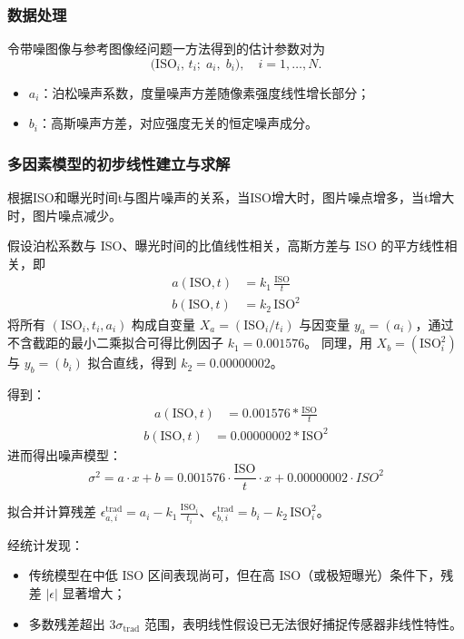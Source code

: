 \documentclass[a4paper]{article}
\begin{document}
    \subsubsection{数据处理}
    令带噪图像与参考图像经问题一方法得到的估计参数对为
	\[
		\bigl(\mathrm{ISO}_i,\,t_i;\;a_i,\;b_i\bigr),\quad
		i=1,\dots,N.
	\]
	\begin{itemize}
		\item $a_i$：泊松噪声系数，度量噪声方差随像素强度线性增长部分；
		\item $b_i$：高斯噪声方差，对应强度无关的恒定噪声成分。
	\end{itemize}

	
	\subsubsection{多因素模型的初步线性建立与求解}
	
	根据ISO和曝光时间t与图片噪声的关系，当ISO增大时，图片噪点增多，当t增大时，图片噪点减少。\par
	假设泊松系数与 ISO、曝光时间的比值线性相关，高斯方差与 ISO 的平方线性相关，即
	\begin{align}
		a(\mathrm{ISO},t) &= k_1 \,\frac{\mathrm{ISO}}{t}\label{eq:trad_a}\\
		b(\mathrm{ISO},t) &= k_2 \,\mathrm{ISO}^2\label{eq:trad_b}
	\end{align}
	\hspace{2em}将所有 $(\mathrm{ISO}_i,t_i,a_i)$ 构成自变量 $X_a=(\mathrm{ISO}_i/t_i)$ 与因变量 $y_a=(a_i)$，通过不含截距的最小二乘拟合可得比例因子 $k_1=0.001576$。  
	同理，用 $X_b=(\mathrm{ISO}_i^2)$ 与 $y_b=(b_i)$ 拟合直线，得到 $k_2=0.00000002$。\par
	得到：
	\begin{align}
		a(\mathrm{ISO},t) &= 0.001576*\frac{\mathrm{ISO}}{t}
	\end{align}
	\begin{align}
				b(\mathrm{ISO},t) &= 0.00000002*\mathrm{ISO}^2
	\end{align}
	进而得出噪声模型：
			$$
			\sigma^2 = a \cdot x + b = 0.001576 \cdot \frac{\mathrm{ISO}}{t} \cdot x + 0.00000002 \cdot ISO^2
		$$

	拟合并计算残差
	\(\epsilon^{\mathrm{trad}}_{a,i}=a_i - k_1\,\frac{\mathrm{ISO}_i}{t_i}\)、\(\epsilon^{\mathrm{trad}}_{b,i}=b_i - k_2\,\mathrm{ISO}_i^2\)。\par
	经统计发现：
	\begin{itemize}
		\item 传统模型在中低 ISO 区间表现尚可，但在高 ISO（或极短曝光）条件下，残差 \(|\epsilon|\) 显著增大；
		\item 多数残差超出 \(3\sigma_{\mathrm{trad}}\) 范围，表明线性假设已无法很好捕捉传感器非线性特性。
	\end{itemize}
\end{document}
